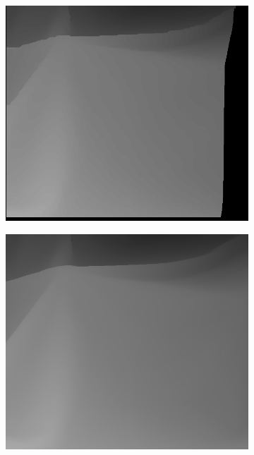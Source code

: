 \documentclass[11pt,a4paper]{article}
\begin{document}
\begin{figure}
\begin{subfigure}[b]{0.13\textwidth}
        \caption{}
        \label{subfig:B}
      \end{subfigure}
      \begin{subfigure}[b]{0.13\textwidth}
        \includegraphics[width=\textwidth]{figures/res5.png}
        \caption{}
        \label{subfig:C}
      \end{subfigure}
      \begin{subfigure}[b]{0.2\textwidth}
        \includegraphics[width=\textwidth]{figures/disp5.png}

\end{subfigure}
\end{figure}
\end{document}
